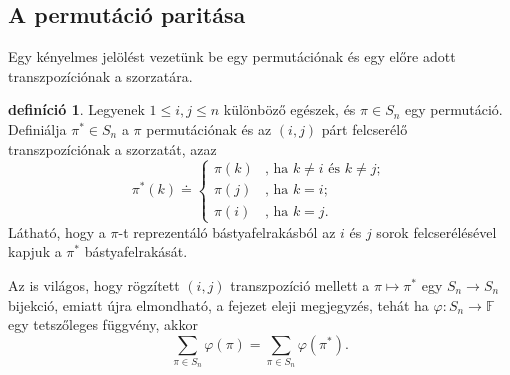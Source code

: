 \documentclass[a4paper, showtrims]{memoir}
\theoremstyle{plain}
\theoremstyle{remark}
\theoremstyle{definition}
\newtheorem{definition}[proposition]{definíció}
\begin{document}
\subsection{A permutáció paritása}
Egy kényelmes jelölést vezetünk be egy permutációnak és egy előre adott transzpozíciónak a szorzatára.
\begin{definition}
	Legyenek $1\leq i,j\leq n$ különböző egészek,
	és $\pi \in S_{n}$ egy permutáció.
	Definiálja $\pi ^{\ast }\in S_{n}$ a $\pi$ permutációnak és az $\left( i,j \right)$ párt felcserélő transzpozíciónak a szorzatát,
	azaz
	\[
		\pi ^{\ast }\left( k\right) \doteq \left\{
		\begin{array}{ll}
			\pi \left( k\right) &
			\text{, ha }k\neq i\text{ és }k\neq j; \\
			\pi \left( j\right) & \text{, ha }k=i; \\
			\pi \left( i\right) & \text{, ha }k=j.
		\end{array}
		\right.
	\]
	Látható,
	hogy a $\pi$-t reprezentáló bástyafelrakásból az $i$ és $j$ sorok felcserélésével kapjuk a $\pi^{\ast}$ bástyafelrakását.
\end{definition}
Az is világos, hogy rögzített $\left( i,j \right)$ transzpozíció mellett a $\pi\mapsto\pi^\ast$ egy $S_n\to S_n$ bijekció,
emiatt újra elmondható, a fejezet eleji megjegyzés,
tehát ha $\varphi:S_n\to\mathbb{F}$ egy tetszőleges függvény, akkor
\[
	\sum_{\pi\in S_n}\varphi\left( \pi \right)
	=
	\sum_{\pi\in S_n}\varphi\left( \pi^\ast \right).
\]
\end{document}
